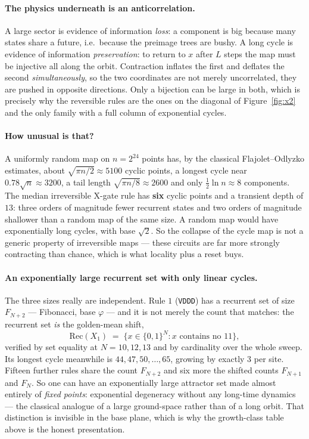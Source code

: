 \documentclass[11pt]{article}
\newcommand{\rt}[1]{\texttt{#1}}
\theoremstyle{plain}
\theoremstyle{definition}
\begin{document}
\paragraph{The physics underneath is an anticorrelation.} A large sector is
evidence of information \emph{loss}: a component is big because many states share
a future, i.e.\ because the preimage trees are bushy. A long cycle is evidence of
information \emph{preservation}: to return to $x$ after $L$ steps the map must be
injective all along the orbit. Contraction inflates the first and deflates the
second \emph{simultaneously}, so the two coordinates are not merely uncorrelated,
they are pushed in opposite directions. Only a bijection can be large in both,
which is precisely why the reversible rules are the ones on the diagonal of
Figure~\ref{fig:x2} and the only family with a full column of exponential cycles.

\paragraph{How unusual is that?} A uniformly random map on $n=2^{24}$ points has,
by the classical Flajolet--Odlyzko estimates, about $\sqrt{\pi n/2}\approx5100$
cyclic points, a longest cycle near $0.78\sqrt n\approx3200$, a tail length
$\sqrt{\pi n/8}\approx2600$ and only $\tfrac12\ln n\approx8$ components. The
median irreversible X-gate rule has \textbf{six} cyclic points and a transient
depth of \textbf{$13$}: three orders of magnitude fewer recurrent states and two
orders of magnitude shallower than a random map of the same size. A random map
would have exponentially long cycles, with base $\sqrt2$. So the collapse of the
cycle map is not a generic property of irreversible maps --- these circuits are
far more strongly contracting than chance, which is what locality plus a reset
buys.

\paragraph{An exponentially large recurrent set with only linear cycles.} The
three sizes really are independent. Rule $1$ (\rt{VDDD}) has a recurrent set of
size $F_{N+2}$ --- Fibonacci, base $\varphi$ --- and it is not merely the count
that matches: the recurrent set \emph{is} the golden-mean shift,
\[
\mathrm{Rec}(X_1) \;=\; \{x\in\{0,1\}^N : x \text{ contains no } 11\},
\]
verified by set equality at $N=10,12,13$ and by cardinality over the whole sweep.
Its longest cycle meanwhile is $44,47,50,\ldots,65$, growing by exactly $3$ per
site. Fifteen further rules share the count $F_{N+2}$ and six more the shifted
counts $F_{N+1}$ and $F_N$. So one can have an exponentially large attractor set
made almost entirely of \emph{fixed points}: exponential degeneracy without any
long-time dynamics --- the classical analogue of a large ground-space rather than
of a long orbit. That distinction is invisible in the base plane, which is why
the growth-class table above is the honest presentation.
\end{document}
